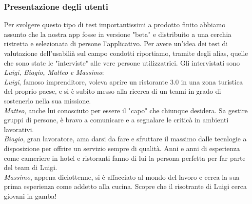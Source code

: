     \subsubsection{Presentazione degli utenti}
        \begin{flushleft}
            Per svolgere questo tipo di test importantissimi a prodotto finito abbiamo assunto che la nostra app fosse in versione "beta" e
            distribuito a una cerchia ristretta e selezionata di persone l'applicativo.
            Per avere un'idea dei test di valutazione dell'usabilià sul campo condotti riportiamo, tramite degli alias, quelle che sono state le
            "interviste" alle vere persone utilizzatrici.
            Gli intervistati sono \emph{Luigi, Biagio, Matteo e Massimo}:
            \\\emph{Luigi}, famoso imprenditore, voleva aprire un ristorante 3.0 in una zona turistica del proprio paese, e si è subito messo alla ricerca di un teami
            in grado di sostenerlo nella sua missione. 
            \\\emph{Matteo}, anche lui conosciuto per essere il "capo" che chiunque desidera. Sa gestire gruppi di persone, è bravo a comunicare e a segnalare le criticà in ambienti lavorativi.
            \\\emph{Biagio}, gran lavoratore, ama darsi da fare e sfruttare il massimo dalle tecnlogie a disposizione per offrire un servizio sempre di qualità.
            Anni e anni di esperienza come cameriere in hotel e ristoranti fanno di lui la persona perfetta per far parte del team di Luigi.
            \\\emph{Massimo}, appena diciottenne, si è affacciato al mondo del lavoro e cerca la sua prima esperienza come addetto alla cucina. Scopre che il risotrante di Luigi cerca giovani in gamba!
        
        \end{flushleft}

